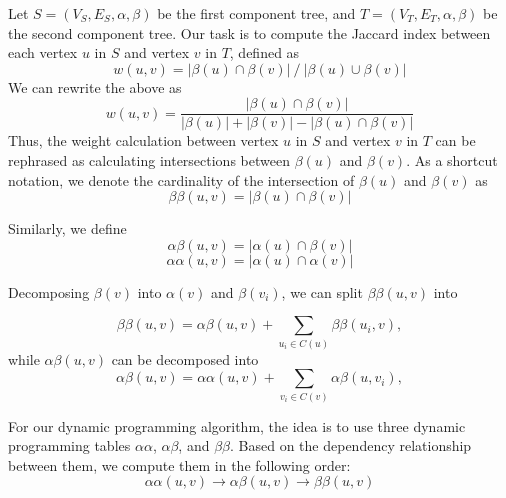 Let $S=(V_S,E_S,\alpha,\beta)$ be the first component tree, and
$T=(V_T,E_T,\alpha,\beta)$ be the second component tree. Our task is to compute
the Jaccard index between each vertex $u$ in $S$ and vertex $v$ in $T$, defined
as
\begin{equation*}
w(u,v) = |\beta(u) \cap \beta(v)| ~/~ |\beta(u) \cup \beta(v)|
\end{equation*}
We can rewrite the above as
\begin{equation*}\label{eqn:jaccard-rephrase}
w(u,v) = \frac{|\beta(u) \cap \beta(v)|}{|\beta(u)| + |\beta(v)| - |\beta(u) \cap \beta(v)|}
\end{equation*}
Thus, the weight calculation between vertex $u$ in $S$ and vertex $v$ in $T$ can
be rephrased as calculating intersections between $\beta(u)$ and $\beta(v)$. As
a shortcut notation, we denote the cardinality of the intersection of $\beta(u)$
and $\beta(v)$ as
\begin{equation*}
  \label{eqn:betabeta}
  \beta\beta(u,v) = |\beta(u) \cap \beta(v)|  
\end{equation*}

Similarly, we define 
\begin{equation*} \label{eqn:alphabeta}
\alpha\beta(u,v) = |\alpha(u) \cap \beta(v)|  
\end{equation*}
\begin{equation*} \label{eqn:alphaalpha}
\alpha\alpha(u,v) = |\alpha(u)\cap\alpha(v)|
\end{equation*}

Decomposing $\beta(v)$ into $\alpha(v)$ and $\beta(v_i)$, we can split $\beta\beta(u,v)$ into

\begin{equation*} \label{eqn:betabeta-comp}
\beta\beta(u,v) = \alpha\beta(u,v) + \sum_{u_i \in C(u)}\beta\beta(u_i,v),
\end{equation*}
while $\alpha\beta(u,v)$ can be decomposed into
\begin{equation*} \label{eqn:alphabeta-comp}
\alpha\beta(u,v) = \alpha\alpha(u,v) + \sum_{v_i \in C(v)}\alpha\beta(u,v_i),
\end{equation*}

For our dynamic programming algorithm, the idea is to use three dynamic
programming tables $\alpha\alpha$, $\alpha\beta$, and $\beta\beta$. Based on the
dependency relationship between them, we compute them in the following
order:
\begin{equation*}
\alpha\alpha(u,v) \to \alpha\beta(u,v) \to \beta\beta(u,v)  
\end{equation*}

